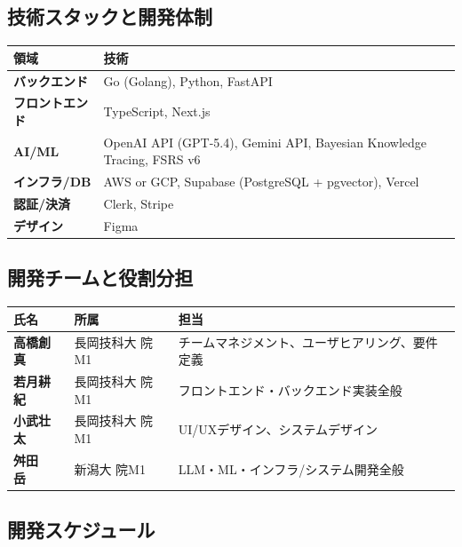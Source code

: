 \documentclass[paper=a4,fontsize=10.5bp,jafontsize=10.5bp,twocolumn]{jlreq}
\begin{document}
\subsection{技術スタックと開発体制}


\begin{footnotesize}\noindent
\begin{tabularx}{\linewidth}{>{\bfseries}l X}
\toprule
領域 & 技術 \\
\midrule
バックエンド & Go (Golang), Python, FastAPI \\
フロントエンド & TypeScript, Next.js \\
AI/ML & OpenAI API (GPT-5.4), Gemini API, Bayesian Knowledge Tracing, FSRS v6 \\
インフラ/DB & AWS or GCP, Supabase (PostgreSQL + pgvector), Vercel \\
認証/決済 & Clerk, Stripe \\
デザイン & Figma \\
\bottomrule
\end{tabularx}
\end{footnotesize}

\subsection{開発チームと役割分担}


\begin{footnotesize}\noindent
\begin{tabularx}{\linewidth}{>{\bfseries}l l X}
\toprule
氏名 & 所属 & 担当 \\
\midrule
高橋創真 & 長岡技科大 院M1 & チームマネジメント、ユーザヒアリング、要件定義 \\
若月耕紀 & 長岡技科大 院M1 & フロントエンド・バックエンド実装全般 \\
小武壮太 & 長岡技科大 院M1 & UI/UXデザイン、システムデザイン \\
舛田　岳 & 新潟大 院M1 & LLM・ML・インフラ/システム開発全般 \\
\bottomrule
\end{tabularx}
\end{footnotesize}

\subsection{開発スケジュール}
\end{document}

